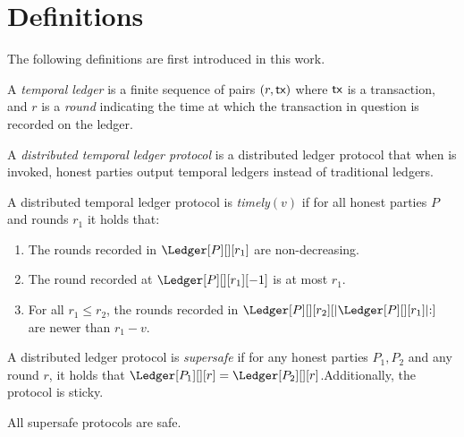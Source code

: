 
\section{Definitions}
The following definitions are first introduced in this work.

\begin{definition}
  A \emph{temporal ledger} is a finite sequence of pairs $(r, \textsf{tx})$ where $\textsf{tx}$ is
  a transaction, and $r$ is a \emph{round} indicating the time at which
  the transaction in question is recorded on the ledger.
\end{definition}

\begin{definition}
  A \emph{distributed temporal ledger protocol} is a distributed ledger protocol
  that when \rread is invoked, honest parties output temporal ledgers instead of traditional ledgers.
\end{definition}

\begin{definition}[Timely]\label{def:timely}
  A distributed temporal ledger protocol is \emph{timely}$(v)$
  if for all honest parties $P$ and rounds $r_1$ it holds that:

  \begin{enumerate}
    \item The rounds recorded in $\Ledger[P][][r_1]$ are non-decreasing.\label{def:timely-increasing}
    \item The round recorded at $\Ledger[P][][r_1][-1]$ is at most $r_1$.\label{def:timely-past}
    \item For all $r_1 \leq r_2$, the rounds recorded in $\Ledger[P][][r_2][|\Ledger[P][][r_1]|{:}]$ are
          newer than $r_1 - v$.\label{def:timely-chunk}
  \end{enumerate}
\end{definition}


\begin{definition}[Supersafety]
  A distributed ledger protocol is \emph{supersafe} if
  for any honest parties $P_1, P_2$ and any round $r$, it holds that
  $\Ledger[P_1][][r] = \Ledger[P_2][][r]$.Additionally, the
  protocol is sticky.
\end{definition}

All supersafe protocols are safe.

